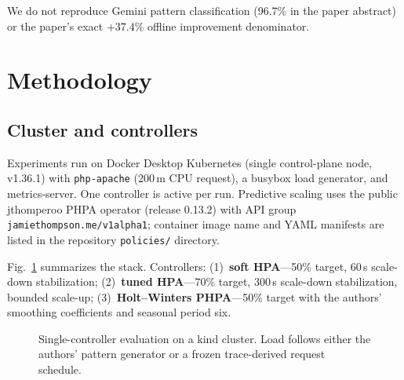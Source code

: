 \documentclass[journal]{IEEEtran}
\begin{document}
We do not reproduce Gemini pattern classification (96.7\% in the paper abstract) or the paper's exact +37.4\% offline improvement denominator.

\section{Methodology}

\subsection{Cluster and controllers}
Experiments run on Docker Desktop Kubernetes (single control-plane node, v1.36.1) with \texttt{php-apache} (200\,m CPU request), a busybox load generator, and metrics-server. One controller is active per run. Predictive scaling uses the public jthomperoo PHPA operator (release 0.13.2) with API group \texttt{jamiethompson.me/v1alpha1}; container image name and YAML manifests are listed in the repository \texttt{policies/} directory.

Fig.~\ref{fig:arch} summarizes the stack. Controllers: (1)~\textbf{soft HPA}---50\% target, 60\,s scale-down stabilization; (2)~\textbf{tuned HPA}---70\% target, 300\,s scale-down stabilization, bounded scale-up; (3)~\textbf{Holt--Winters PHPA}---50\% target with the authors' smoothing coefficients and seasonal period six.

\begin{figure}[!t]
\centering
{}
\caption{Single-controller evaluation on a kind cluster. Load follows either the authors' pattern generator or a frozen trace-derived request schedule.}
\label{fig:arch}
\end{figure}
\end{document}
